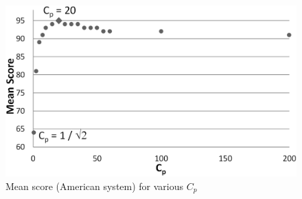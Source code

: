 \documentclass[letterpaper]{article}
\begin{document}
\begin{figure}[t]
\begin{center}
\includegraphics[width=1\linewidth]{images/Cp.png}
\end{center}
\caption{Mean score (American system) for various $C_p$}
\label{fig:Cp}
\end{figure}


\end{document}
